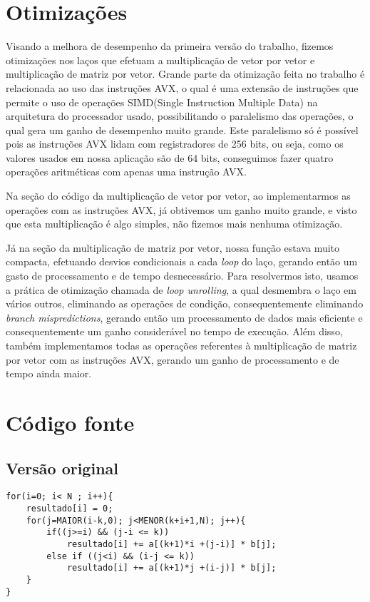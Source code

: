 \documentclass[12pt]{article}
\begin{document}
\section{Otimizações}

Visando a melhora de desempenho da primeira versão do trabalho, fizemos otimizações nos laços que efetuam a multiplicação de vetor por vetor e multiplicação de matriz por vetor. Grande parte da otimização feita no trabalho é relacionada ao uso das instruções AVX, o qual é uma extensão de instruções que permite o uso de operações SIMD(Single Instruction Multiple Data) na arquitetura do processador usado, possibilitando o paralelismo das operações, o qual gera um ganho de desempenho muito grande. Este paralelismo só é possível pois as instruções AVX lidam com registradores de 256 bits, ou seja, como os valores usados em nossa aplicação são de 64 bits, conseguimos fazer quatro operações aritméticas com apenas uma instrução AVX.

Na seção do código da multiplicação de vetor por vetor, ao implementarmos as operações com as instruções AVX, já obtivemos um ganho muito grande, e visto que esta multiplicação é algo simples, não fizemos mais nenhuma otimização.

Já na seção da multiplicação de matriz por vetor, nossa função estava muito compacta, efetuando desvios condicionais a cada \textit{loop} do laço, gerando então um gasto de processamento e de tempo desnecessário. Para resolvermos isto, usamos a prática de otimização chamada de \textit{loop unrolling}, a qual desmembra o laço em vários outros, eliminando as operações de condição, consequentemente eliminando \textit{branch mispredictions}, gerando então um processamento de dados mais eficiente e consequentemente um ganho considerável no tempo de execução. Além disso, também implementamos todas as operações referentes à multiplicação de matriz por vetor com as instruções AVX, gerando um ganho de processamento e de tempo ainda maior.

\section{Código fonte}

\subsection{Versão original}
\begin{lstlisting}
for(i=0; i< N ; i++){
    resultado[i] = 0;
    for(j=MAIOR(i-k,0); j<MENOR(k+i+1,N); j++){
        if((j>=i) && (j-i <= k))
            resultado[i] += a[(k+1)*i +(j-i)] * b[j];
        else if ((j<i) && (i-j <= k))
            resultado[i] += a[(k+1)*j +(i-j)] * b[j];
    }
}
\end{lstlisting}
\end{document}
